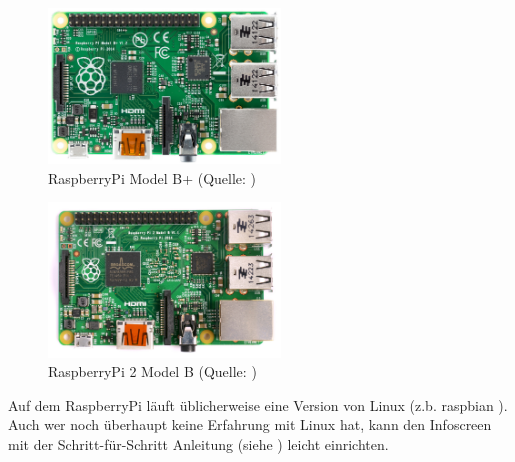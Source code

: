 \begin{figure}[h!]
	\centering
		\includegraphics[width=0.55\textwidth]{./fotos/Raspberry_Pi_B+_top.jpg}
	\caption{RaspberryPi Model B+ (Quelle: \cite{rpibplus})}
	\label{fig:rpibplus}
\end{figure}

\begin{figure}[h!]
	\centering
		\includegraphics[width=0.55\textwidth]{./fotos/Raspberry_Pi_2_Model_B_v1-1_top_new.jpg}
	\caption{RaspberryPi 2 Model B (Quelle: \cite{rpi2b})}
	\label{fig:rpi2b}
\end{figure}

\clearpage

Auf dem RaspberryPi läuft üblicherweise eine Version von Linux (z.b. raspbian \cite{raspbian}).
Auch wer noch überhaupt keine Erfahrung mit Linux hat, kann den Infoscreen mit der Schritt-für-Schritt Anleitung (siehe ) leicht einrichten.



